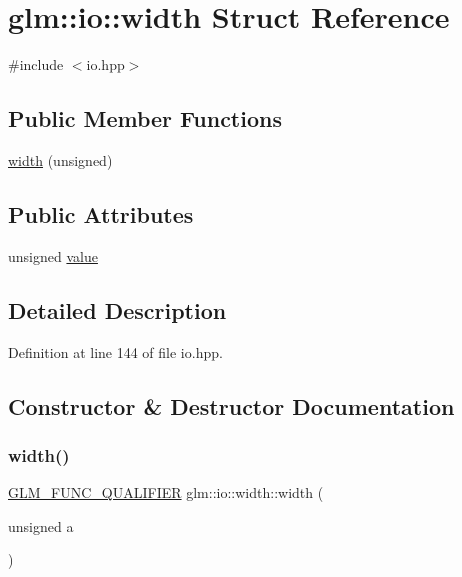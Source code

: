 \hypertarget{structglm_1_1io_1_1width}{}\section{glm\+:\+:io\+:\+:width Struct Reference}
\label{structglm_1_1io_1_1width}


{\ttfamily \#include $<$io.\+hpp$>$}

\subsection*{Public Member Functions}
\begin{DoxyCompactItemize}
\item 
\hyperlink{structglm_1_1io_1_1width_a1576674b7e08dc5014ce4f41ac6eea5b}{width} (unsigned)
\end{DoxyCompactItemize}
\subsection*{Public Attributes}
\begin{DoxyCompactItemize}
\item 
unsigned \hyperlink{structglm_1_1io_1_1width_a6bf1338eb947811d36ec93bd2e9b8425}{value}
\end{DoxyCompactItemize}


\subsection{Detailed Description}


Definition at line 144 of file io.\+hpp.



\subsection{Constructor \& Destructor Documentation}
\mbox{\label{structglm_1_1io_1_1width_a1576674b7e08dc5014ce4f41ac6eea5b}} 
\subsubsection{\texorpdfstring{width()}{width()}}
{\footnotesize\ttfamily \hyperlink{setup_8hpp_a33fdea6f91c5f834105f7415e2a64407}{G\+L\+M\+\_\+\+F\+U\+N\+C\+\_\+\+Q\+U\+A\+L\+I\+F\+I\+ER} glm\+::io\+::width\+::width (\begin{DoxyParamCaption}\item[{unsigned}]{a }\end{DoxyParamCaption})\hspace{0.3cm}{\ttfamily [explicit]}}



